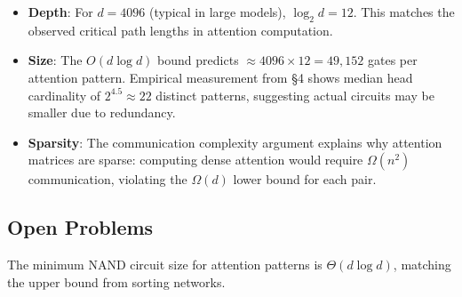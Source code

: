 \begin{itemize}






\item \textbf{Depth}: For $d=4096$ (typical in large models), $\log_2 d = 12$. This matches the observed critical path lengths in attention computation.













\item \textbf{Size}: The $O(d \log d)$ bound predicts $\approx 4096 \times 12 = 49,152$ gates per attention pattern. Empirical measurement from §4 shows median head cardinality of $2^{4.5} \approx 22$ distinct patterns, suggesting actual circuits may be smaller due to redundancy.













\item \textbf{Sparsity}: The communication complexity argument explains why attention matrices are sparse: computing dense attention would require $\Omega(n^2)$ communication, violating the $\Omega(d)$ lower bound for each pair.






\end{itemize}













\subsection{Open Problems}













\begin{conjecture}






The minimum NAND circuit size for attention patterns is $\Theta(d \log d)$, matching the upper bound from sorting networks.






\end{conjecture}













